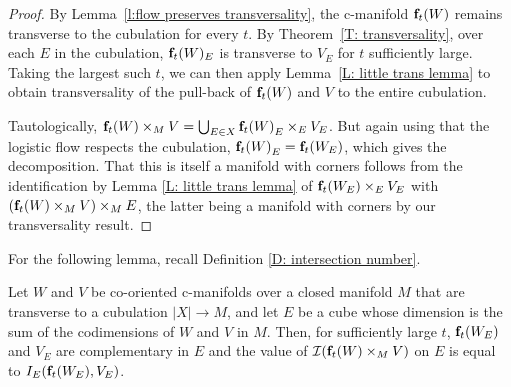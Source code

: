 \begin{proof}
	By Lemma~\ref{l:flow preserves transversality}, the c-manifold $\mathbf{f}_t(W)$ remains transverse to the cubulation for every $t$.
	By Theorem~\ref{T: transversality}, over each $E$ in the cubulation, $\mathbf{f}_t(W)_E$ is transverse to $V_E$ for $t$ sufficiently large. Taking the largest
	such $t$, we can then apply Lemma~\ref{L: little trans lemma} to obtain transversality of the pull-back of $\mathbf{f}_t(W)$ and $V$ to the entire cubulation. 
	
	Tautologically, $ \mathbf{f}_t(W) \times_M V = \bigcup_{E \in X} {\mathbf{f}_t(W)}_E \times_E V_E$.
	But again using that the logistic flow respects the cubulation, ${\mathbf{f}_t(W)}_E = {\mathbf{f}_t(W_E)}$, which gives the decomposition.
	That this is itself a manifold with corners follows from the identification by Lemma \ref{L: little trans lemma} of $ {\mathbf{f}_t(W_E)} \times_E V_E$ with $(\mathbf{f}_t(W) \times_M V)\times_M E$, the latter being a manifold with corners by our transversality result.
\end{proof}

For the following lemma, recall Definition \ref{D: intersection number}.

\begin{lemma} \label{L: intersection signs}
	Let $W$ and $V$ be co-oriented c-manifolds over a closed manifold $M$ that are transverse to a cubulation $|X| \to M$, and let $E$ be a cube whose dimension
	is the sum of the codimensions of $W$ and $V$ in $M$. Then, for sufficiently large $t$, $\mathbf{f}_t(W_E)$ and $V_E$ are complementary in $E$ and the value of $\mathcal{I}(\mathbf{f}_t(W) \times_M V)$ on $E$
	is equal to $I_E(\mathbf{f}_t(W_E), V_E)$.
\end{lemma}

